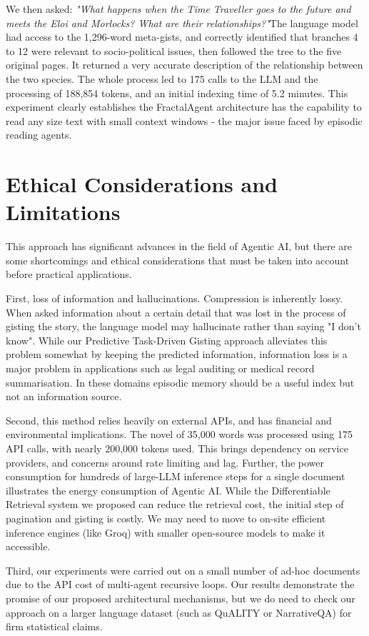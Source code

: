 \documentclass[conference]{IEEEtran}
\begin{document}
We then asked: \textit{"What happens when the Time Traveller goes to the future and meets the Eloi and Morlocks? What are their relationships?"}The language model had access to the 1,296-word meta-gists, and correctly identified that branches 4 to 12 were relevant to socio-political issues, then followed the tree to the five original pages. It returned a very accurate description of the relationship between the two species. The whole process led to 175 calls to the LLM and the processing of 188,854 tokens, and an initial indexing time of 5.2 minutes. This experiment clearly establishes the FractalAgent architecture has the capability to read any size text with small context windows - the major issue faced by episodic reading agents.

\section{Ethical Considerations and Limitations}
This approach has significant advances in the field of Agentic AI, but there are some shortcomings and ethical considerations that must be taken into account before practical applications.

First, loss of information and hallucinations. Compression is inherently lossy. When asked information about a certain detail that was lost in the process of gisting the story, the language model may hallucinate rather than saying "I don't know". While our Predictive Task-Driven Gisting approach alleviates this problem somewhat by keeping the predicted information, information loss is a major problem in applications such as legal auditing or medical record summarisation. In these domains episodic memory should be a useful index but not an information source.

Second, this method relies heavily on external APIs, and has financial and environmental implications. The novel of 35,000 words was processed using 175 API calls, with nearly 200,000 tokens used. This brings dependency on service providers, and concerns around rate limiting and lag. Further, the power consumption for hundreds of large-LLM inference steps for a single document illustrates the energy consumption of Agentic AI. While the Differentiable Retrieval system we proposed can reduce the retrieval cost, the initial step of pagination and gisting is costly. We may need to move to on-site efficient inference engines (like Groq) with smaller open-source models to make it accessible.

Third, our experiments were carried out on a small number of ad-hoc documents due to the API cost of multi-agent recursive loops. Our results demonstrate the promise of our proposed architectural mechanisms, but we do need to check our approach on a larger language dataset (such as QuALITY or NarrativeQA) for firm statistical claims. 
\end{document}
